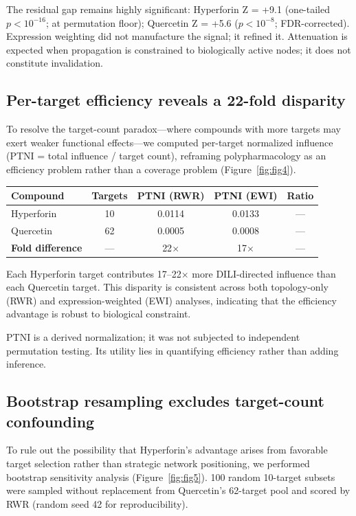 The residual gap remains highly significant: Hyperforin Z = +9.1 (one-tailed $p < 10^{-16}$; at permutation floor); Quercetin Z = +5.6 ($p < 10^{-8}$; FDR-corrected).
Expression weighting did not manufacture the signal; it refined it.
Attenuation is expected when propagation is constrained to biologically active nodes; it does not constitute invalidation.

\subsection{Per-target efficiency reveals a 22-fold disparity}

To resolve the target-count paradox---where compounds with more targets may exert weaker functional effects---we computed per-target normalized influence (PTNI = total influence / target count), reframing polypharmacology as an efficiency problem rather than a coverage problem (Figure~\ref{fig:fig4}).

\begin{center}
\begin{tabular}{lcccc}
\toprule
\textbf{Compound} & \textbf{Targets} & \textbf{PTNI (RWR)} & \textbf{PTNI (EWI)} & \textbf{Ratio} \\
\midrule
Hyperforin & 10 & 0.0114 & 0.0133 & --- \\
Quercetin & 62 & 0.0005 & 0.0008 & --- \\
\textbf{Fold difference} & --- & 22$\times$ & 17$\times$ & --- \\
\bottomrule
\end{tabular}
\end{center}

Each Hyperforin target contributes 17--22$\times$ more DILI-directed influence than each Quercetin target.
This disparity is consistent across both topology-only (RWR) and expression-weighted (EWI) analyses, indicating that the efficiency advantage is robust to biological constraint.

PTNI is a derived normalization; it was not subjected to independent permutation testing.
Its utility lies in quantifying efficiency rather than adding inference.

\subsection{Bootstrap resampling excludes target-count confounding}

To rule out the possibility that Hyperforin's advantage arises from favorable target selection rather than strategic network positioning, we performed bootstrap sensitivity analysis (Figure~\ref{fig:fig5}).
100 random 10-target subsets were sampled without replacement from Quercetin's 62-target pool and scored by RWR (random seed 42 for reproducibility).

